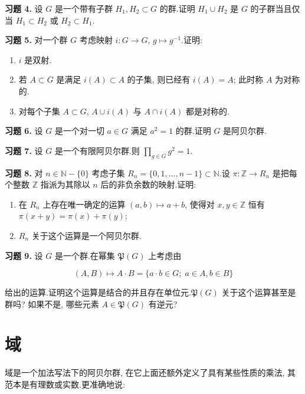 \medskip
\noindent\textbf{习题 4.} 设 $G$ 是一个带有子群 $H_1, H_2 \subset G$ 的群.证明 $H_1 \cup H_2$ 是 $G$ 的子群当且仅当 $H_1 \subset H_2$ 或 $H_2 \subset H_1$.

\medskip
\noindent\textbf{习题 5.} 对一个群 $G$ 考虑映射 $i \colon G \longrightarrow G$, $g \longmapsto g^{-1}$.证明:
\begin{enumerate}
\item[(i)] $i$ 是双射.
\item[(ii)] 若 $A \subset G$ 是满足 $i(A) \subset A$ 的子集, 则已经有 $i(A) = A$; 此时称 $A$ 为对称的.
\item[(iii)] 对每个子集 $A \subset G$, $A \cup i(A)$ 与 $A \cap i(A)$ 都是对称的.
\end{enumerate}

\medskip
\noindent\textbf{习题 6.} 设 $G$ 是一个对一切 $a \in G$ 满足 $a^2 = 1$ 的群.证明 $G$ 是阿贝尔群.

\medskip
\noindent\textbf{习题 7.} 设 $G$ 是一个有限阿贝尔群.则 $\prod_{g \in G} g^2 = 1$.

\medskip
\noindent\textbf{习题 8.} 对 $n \in \mathbb{N} - \{0\}$ 考虑子集 $R_n = \{0, 1, \ldots, n - 1\} \subset \mathbb{N}$.设 $\pi \colon \mathbb{Z} \longrightarrow R_n$ 是把每个整数 $\mathbb{Z}$ 指派为其除以 $n$ 后的非负余数的映射.证明:
\begin{enumerate}
\item[(i)] 在 $R_n$ 上存在唯一确定的运算 $(a, b) \longmapsto a + b$, 使得对 $x, y \in \mathbb{Z}$ 恒有 $\pi(x + y) = \pi(x) + \pi(y)$;
\item[(ii)] $R_n$ 关于这个运算是一个阿贝尔群.
\end{enumerate}

\medskip
\noindent\textbf{习题 9.} 设 $G$ 是一个群.在幂集 $\mathfrak{P}(G)$ 上考虑由

\[
(A, B) \longmapsto A \cdot B = \{a \cdot b \in G;\; a \in A, b \in B\}
\]

给出的运算.证明这个运算是结合的并且存在单位元.$\mathfrak{P}(G)$ 关于这个运算甚至是群吗? 如果不是, 哪些元素 $A \in \mathfrak{P}(G)$ 有逆元?

\section{域}\label{sec:1.3}

域是一个加法写法下的阿贝尔群, 在它上面还额外定义了具有某些性质的乘法, 其范本是有理数或实数.更准确地说:

